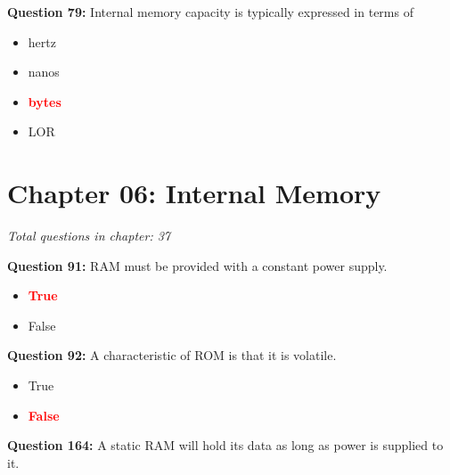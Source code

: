 \documentclass[12pt,a4paper]{article}
\begin{document}
\vspace{0.5cm}

\vspace{0.5cm}

\textbf{Question 79:} Internal memory capacity is typically expressed in terms of \underline{\hspace{1.5cm}}

\begin{itemize}
    \item[\textbf{A.}] hertz
    \item[\textbf{B.}] nanos
    \item[\textbf{C.}] \textcolor{red}{\textbf{bytes}}
    \item[\textbf{D.}] LOR
\end{itemize}

\vspace{0.5cm}

\vspace{0.5cm}

\section{Chapter 06: Internal Memory}
\textit{Total questions in chapter: 37}

\textbf{Question 91:} RAM must be provided with a constant power supply.

\begin{itemize}
    \item[\textbf{A.}] \textcolor{red}{\textbf{True}}
    \item[\textbf{B.}] False
\end{itemize}

\vspace{0.5cm}

\vspace{0.5cm}

\textbf{Question 92:} A characteristic of ROM is that it is volatile.

\begin{itemize}
    \item[\textbf{A.}] True
    \item[\textbf{B.}] \textcolor{red}{\textbf{False}}
\end{itemize}

\vspace{0.5cm}

\vspace{0.5cm}

\textbf{Question 164:} A static RAM will hold its data as long as power is supplied to it.
\end{document}
